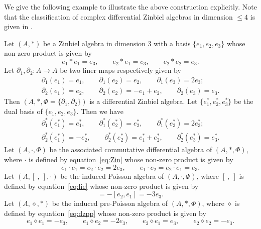 \documentclass[10pt,a4paper]{amsart}
\numberwithin{equation}{section}
\begin{document}
We give the following example to illustrate the above construction explicitly.
Note that the classification of complex differential Zinbiel algebras in dimension $\leq 4$ is given in \cite{almutari2018derivations}.
\begin{Example}
 Let $(A,\ast)$ be a Zinbiel algebra in dimension 3 with a basis $\{e_1, e_2, e_3\}$ whose non-zero product is given by
 \begin{equation*}
 e_1 \ast e_1 = e_3, \qquad e_2 \ast e_1 = e_3, \qquad e_2 \ast e_2 = e_3.
 \end{equation*}
 Let $\partial_1, \partial_2\colon A \to A$ be two liner maps respectively given by
 \begin{gather*}
 \partial_1(e_1) = e_1, \qquad \partial_1(e_2) = e_2, \qquad \partial_1(e_3) = 2 e_3; \\
 \partial_2(e_1) = e_2, \qquad \partial_2(e_2) = -e_1 + e_2, \qquad \partial_2(e_3) = e_3.
 \end{gather*}
 Then $(A, \ast, \Phi = \{\partial_1, \partial_2\})$ is a differential Zinbiel algebra.
 Let $\{e_1^*, e_2^*, e_3^*\}$ be the dual basis of $\{e_1, e_2, e_3\}$.
 Then we have
 \begin{gather*}
 \partial_1^*(e_1^*) = e_1^*, \qquad \partial_1^*(e_2^*) = e_2^*, \qquad \partial_1^*(e_3^*) = 2 e_3^*; \\
 \partial_2^*(e_1^*) = -e_2^*, \qquad \partial_2^*(e_2^*) = e_1^* + e_2^*, \qquad \partial_2^*(e_3^*) = e_3^*.
 \end{gather*}
 Let $(A, \cdot, \Phi)$ be the associated commutative differential algebra of $(A, \ast, \Phi)$, where $\cdot$ is defined by equation~\eqref{eq:Zin} whose non-zero product is given by
 \begin{equation*}
 e_1 \cdot e_1 = e_2 \cdot e_2 = 2 e_3, \qquad
 e_1 \cdot e_2 = e_2 \cdot e_1 = e_3.
 \end{equation*}
 Let $(A, [\ ,\ ], \cdot)$ be the induced Poisson algebra of $(A, \cdot, \Phi)$, where $[\ ,\ ]$ is defined by equation~\eqref{eq:lie} whose non-zero product is given by
 \begin{equation*}
 [e_1, e_2] = -[e_2, e_1] = -3 e_3.
 \end{equation*}
 Let $(A, \diamond, \ast)$ be the induced pre-Poisson algebra of $(A, \ast, \Phi)$, where $\diamond$ is defined by equation~\eqref{eq:dzpp} whose non-zero product is given by
 \begin{equation*}
 e_1 \diamond e_1 = - e_3, \qquad
 e_1 \diamond e_2 = -2 e_3, \qquad
 e_2 \diamond e_1 = e_3, \qquad
 e_2 \diamond e_2 = - e_3.

\end{equation*}
\end{Example}
\end{document}
